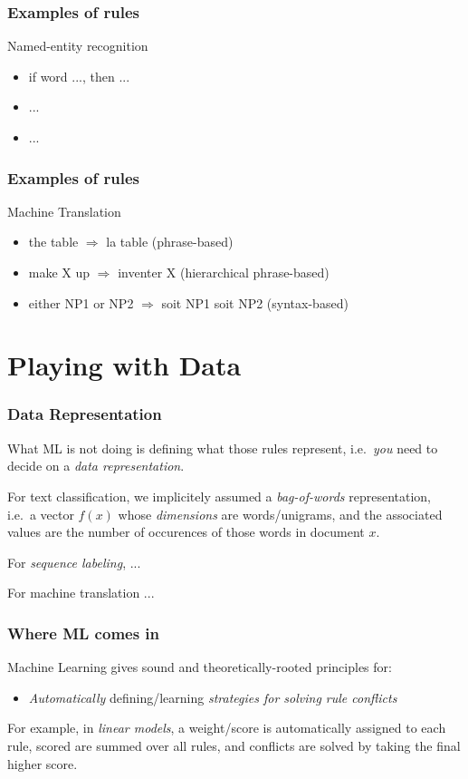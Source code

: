 \documentclass[usenames,dvipsnames]{beamer}
\newcommand{\voc}[1]{\emph{\color{ForestGreen}#1}}
\begin{document}
\begin{frame}\frametitle{Examples of rules}

Named-entity recognition
\begin{itemize}
\item if word ..., then ...
\item ...
\item ...
\end{itemize}
\end{frame}

\begin{frame}\frametitle{Examples of rules}

Machine Translation
\begin{itemize}
\item the table $\Rightarrow$ la table (phrase-based)
\item make X up $\Rightarrow$ inventer X (hierarchical phrase-based)
\item either NP1 or NP2 $\Rightarrow$ soit NP1 soit NP2 (syntax-based)
\end{itemize}
\end{frame}


\section{Playing with Data}
\begin{frame}\frametitle{Data Representation}

What ML is not doing is defining what those rules represent,
i.e.\ \emph{you} need to decide on a \voc{data representation}.

\vspace{0.4cm}
For text classification, we implicitely assumed a \voc{bag-of-words} representation, i.e.\
a vector $f(x)$ whose \voc{dimensions} are words/unigrams, and the
associated values are the number of occurences of those words in
document $x$.

\vspace{0.4cm}
For \voc{sequence labeling}, ...

\vspace{0.4cm}
For machine translation ...

\end{frame}


\begin{frame}\frametitle{Where ML comes in}

\begin{block}{Machine Learning gives sound and theoretically-rooted principles for:}
\begin{itemize}
\item \emph{Automatically} defining/learning \voc{strategies for solving rule conflicts}
\end{itemize}
\end{block}

\vspace{0.4cm}
For example, in \voc{linear models}, a weight/score is automatically assigned to
each rule, scored are summed over all rules, and conflicts are solved by
taking the final higher score.

\end{frame}
\end{document}
